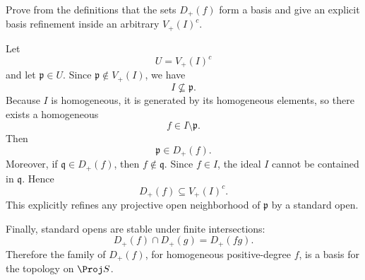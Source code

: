 \begin{problem}\label{prob:vi35-01}
Prove from the definitions that the sets \(D_+(f)\) form a basis and give an explicit basis refinement inside an arbitrary \(V_+(I)^c\).
\end{problem}

\ifdefined\FullProblemDossiers
\begin{solution}
Let
\[
U=V_+(I)^c
\]
and let \(\mathfrak p\in U\). Since \(\mathfrak p\notin V_+(I)\), we have
\[
I\not\subseteq\mathfrak p.
\]
Because \(I\) is homogeneous, it is generated by its homogeneous elements, so there exists a homogeneous
\[
f\in I\setminus\mathfrak p.
\]
Then
\[
\mathfrak p\in D_+(f).
\]
Moreover, if \(\mathfrak q\in D_+(f)\), then \(f\notin\mathfrak q\). Since \(f\in I\), the ideal \(I\) cannot be
contained in \(\mathfrak q\). Hence
\[
D_+(f)\subseteq V_+(I)^c.
\]
This explicitly refines any projective open neighborhood of \(\mathfrak p\) by a standard open.

Finally, standard opens are stable under finite intersections:
\[
D_+(f)\cap D_+(g)=D_+(fg).
\]
Therefore the family of \(D_+(f)\), for homogeneous positive-degree \(f\), is a basis for the topology on
\(\Proj S\).
\end{solution}
\fi
